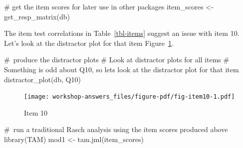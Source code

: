 \documentclass[
  letterpaper,
  DIV=11,
  numbers=noendperiod]{scrreprt}
\newenvironment{Shaded}{\begin{snugshade}}{\end{snugshade}}
\newcommand{\CommentTok}[1]{\textcolor[rgb]{0.37,0.37,0.37}{#1}}
\newcommand{\FunctionTok}[1]{\textcolor[rgb]{0.28,0.35,0.67}{#1}}
\newcommand{\NormalTok}[1]{\textcolor[rgb]{0.00,0.23,0.31}{#1}}
\newcommand{\OtherTok}[1]{\textcolor[rgb]{0.00,0.23,0.31}{#1}}
\newcommand{\SpecialCharTok}[1]{\textcolor[rgb]{0.37,0.37,0.37}{#1}}
\newcommand{\StringTok}[1]{\textcolor[rgb]{0.13,0.47,0.30}{#1}}
\begin{document}
\begin{Shaded}
\begin{Highlighting}[]
\CommentTok{\# get the item scores for later use in other packages}
\NormalTok{item\_scores }\OtherTok{\textless{}{-}} \FunctionTok{get\_resp\_matrix}\NormalTok{(db)}
\end{Highlighting}
\end{Shaded}

The item test correlations in Table~\ref{tbl-items} suggest an issue
with item 10. Let's look at the distractor plot for that item
Figure~\ref{fig-item10}.

\begin{Shaded}
\begin{Highlighting}[]
\CommentTok{\# produce the distractor plots}
\CommentTok{\# Look at distractor plots for all items}
\CommentTok{\# Something is odd about Q10, so let\textquotesingle{}s look at the distractor plot for that item}
\FunctionTok{distractor\_plot}\NormalTok{(db, }\StringTok{\textquotesingle{}Q10\textquotesingle{}}\NormalTok{)}
\end{Highlighting}
\end{Shaded}

\begin{figure}[H]

{\centering \texttt{[image: workshop-answers\_files/figure-pdf/fig-item10-1.pdf]}

}

\caption{\label{fig-item10}Item 10}

\end{figure}

\begin{Shaded}
\begin{Highlighting}[]
\CommentTok{\# run a traditional Rasch analysis using the item scores produced above}
\FunctionTok{library}\NormalTok{(TAM)}
\NormalTok{mod1 }\OtherTok{\textless{}{-}} \FunctionTok{tam.jml}\NormalTok{(item\_scores)}
\end{Highlighting}
\end{Shaded}

\begin{Shaded}
\end{Shaded}
\end{document}
